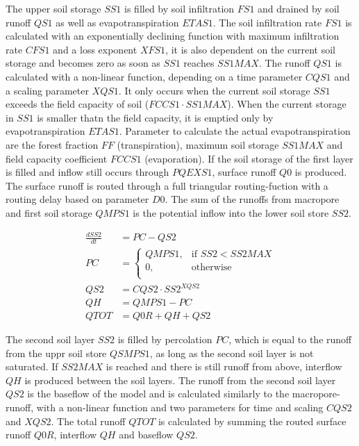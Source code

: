 The upper soil storage $SS1$ is filled by soil infiltration $FS1$ and drained by soil runoff $QS1$ as well as evapotranspiration $ETAS1$.
The soil infiltration rate $FS1$ is calculated with an exponentially declining function with maximum infiltration rate $CFS1$ and a loss exponent $XFS1$, it is also dependent on the current soil storage and becomes zero as soon as $SS1$ reaches $SS1MAX$.
The runoff $QS1$ is calculated with a non-linear function, depending on a time parameter $CQS1$ and a scaling parameter $XQS1$.
It only occurs when the current soil storage $SS1$ exceeds the field capacity of soil ($FCCS1\cdot SS1MAX$).
When the current storage in $SS1$ is smaller thatn the field capacity, it is emptied only by evapotranspiration $ETAS1$.
Parameter to calculate the actual evapotranspiration are the forest fraction $FF$ (transpiration), maximum soil storage $SS1MAX$ and field capacity coefficient $FCCS1$ (evaporation).
If the soil storage of the first layer is filled and inflow still occurs through $PQEXS1$, surface runoff $Q0$ is produced.
The surface runoff is routed through a full triangular routing-fuction with a routing delay based on parameter $D0$.
The sum of the runoffs from macropore and first soil storage $QMPS1$ is the potential inflow into the lower soil store $SS2$.

\begin{align}
	\frac{dSS2}{dt} &= PC-QS2 \\
	PC &= 
	\begin{cases}
		QMPS1, & \text{if } SS2 < SS2MAX \\
		0, & \text{otherwise}\\
	\end{cases}\\[4pt]
	QS2 &= CQS2\cdot SS2^{XQS2}\\[4pt]
	QH &= QMPS1 - PC\\[4pt]
	QTOT &= Q0R + QH + QS2
\end{align}

The second soil layer $SS2$ is filled by percolation $PC$, which is equal to the runoff from the uppr soil store $QSMPS1$, as long as the second soil layer is not saturated.
If $SS2MAX$ is reached and there is still runoff from above, interflow $QH$ is produced between the soil layers.
The runoff from the second soil layer $QS2$ is the baseflow of the model and is calculated similarly to the macropore-runoff, with a non-linear function and two parameters for time and scaling $CQS2$ and $XQS2$.
The total runoff $QTOT$ is calculated by summing the routed surface runoff $Q0R$, interflow $QH$ and baseflow $QS2$.

